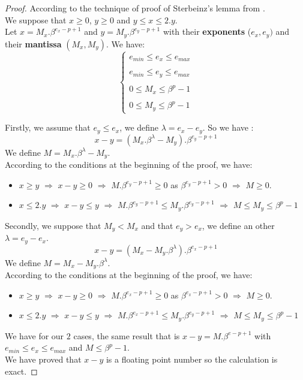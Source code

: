\begin{proof} \color{-yellow}
According to the technique of proof of Sterbeinz's lemma from \cite{muller2010handbook}.\\
We suppose that $ x \ge 0 $, $y \ge 0$ and $y \le x \le 2.y$.\\ 
Let $x = M_x.\beta^{e_x-p+1}$ and $y = M_y.\beta^{e_y-p+1}$ with their \textbf{exponents} ($e_x, e_y)$ and their \textbf{mantissa} $(M_x, M_y)$. We have:\\
$$\left\{
\begin{array}{l}
    e_{min}\le e_x \le e_{max} \\
    \ \\
    e_{min}\le e_y \le e_{max} \\
     \ \\
    0 \le M_x \le \beta^p-1 \\
    \ \\
    0 \le M_y \le \beta^p-1
\end{array}
\right.
$$

Firstly, we assume that $e_y \le e_x$, we define $\lambda = e_x - e_y$.
So we have : 
$$ x-y = (M_x.\beta^{\lambda} -M_y).\beta^{e_y-p+1}$$
We define $M = M_x.\beta^{\lambda} -M_y$.\\
According to the conditions at the beginning of the proof, we have:\\
\begin{itemize}
    \item $x\ge y$ $\Rightarrow$ $x-y \ge 0$ $\Rightarrow$ $M.\beta^{e_y-p+1} \ge 0$ as $\beta^{e_y-p+1} >0$ $\Rightarrow$ $M \ge 0$.
    \item $x\le 2.y$ $\Rightarrow$ $x-y \le y$ $\Rightarrow$ $M.\beta^{e_y-p+1} \le M_y.\beta^{e_y-p+1}$ $\Rightarrow$ $M \le M_y \le \beta^p - 1$
\end{itemize}
Secondly, we suppose that $M_y < M_x$ and that $e_y > e_x$, we define an other $\lambda=e_y - e_x $.
$$ x-y = (M_x -M_y.\beta^{\lambda}).\beta^{e_x-p+1}$$
We define $M = M_x -M_y.\beta^{\lambda}$.\\
According to the conditions at the beginning of the proof, we have:\\
\begin{itemize}
    \item $x\ge y$ $\Rightarrow$ $x-y \ge 0$ $\Rightarrow$ $M.\beta^{e_x-p+1} \ge 0$ as $\beta^{e_x-p+1} >0$ $\Rightarrow$ $M \ge 0$.
    \item $x\le 2.y$ $\Rightarrow$ $x-y \le y$ $\Rightarrow$ $M.\beta^{e_x-p+1} \le M_y.\beta^{e_y-p+1}$ $\Rightarrow$ $M \le M_y \le \beta^p - 1$
\end{itemize}
We have for our $2$ cases, the same result that is $x-y = M.\beta^{e-p+1}$ with  $e_{min}\le e_x \le e_{max}$ and $M \le \beta^p-1$.\\
We have proved that $x-y$ is  a floating point number so the calculation is exact.
\end{proof}

